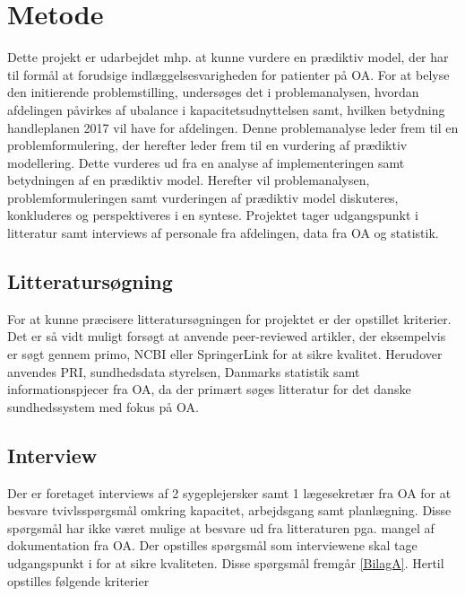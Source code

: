 

\section{Metode}
Dette projekt er udarbejdet mhp. at kunne vurdere en prædiktiv model, der har til formål at forudsige indlæggelsesvarigheden for patienter på OA. For at belyse den initierende problemstilling, undersøges det i problemanalysen, hvordan afdelingen påvirkes af ubalance i kapacitetsudnyttelsen samt, hvilken betydning handleplanen 2017 vil have for afdelingen. Denne problemanalyse leder frem til en problemformulering, der herefter leder frem til en vurdering af prædiktiv modellering. Dette vurderes ud fra en analyse af implementeringen samt betydningen af en prædiktiv model. Herefter vil problemanalysen, problemformuleringen samt vurderingen af prædiktiv model diskuteres, konkluderes og perspektiveres i en syntese. Projektet tager udgangspunkt i litteratur samt interviews af personale fra afdelingen, data fra OA og statistik. 


\subsection{Litteratursøgning}
For at kunne præcisere litteratursøgningen for projektet er der opstillet kriterier. Det er så vidt muligt forsøgt at anvende peer-reviewed artikler, der eksempelvis er søgt gennem primo, NCBI eller SpringerLink for at sikre kvalitet. Herudover anvendes PRI, sundhedsdata styrelsen, Danmarks statistik samt informationspjecer fra OA, da der primært søges litteratur for det danske sundhedssystem med fokus på OA. 


\subsection{Interview}
Der er foretaget interviews af 2 sygeplejersker samt 1 lægesekretær fra OA for at besvare tvivlsspørgsmål omkring kapacitet, arbejdsgang samt planlægning. Disse spørgsmål har ikke været mulige at besvare ud fra litteraturen pga. mangel af dokumentation fra OA. Der opstilles spørgsmål som interviewene skal tage udgangspunkt i for at sikre kvaliteten. Disse spørgsmål fremgår \ref{BilagA}. Hertil opstilles følgende kriterier 




